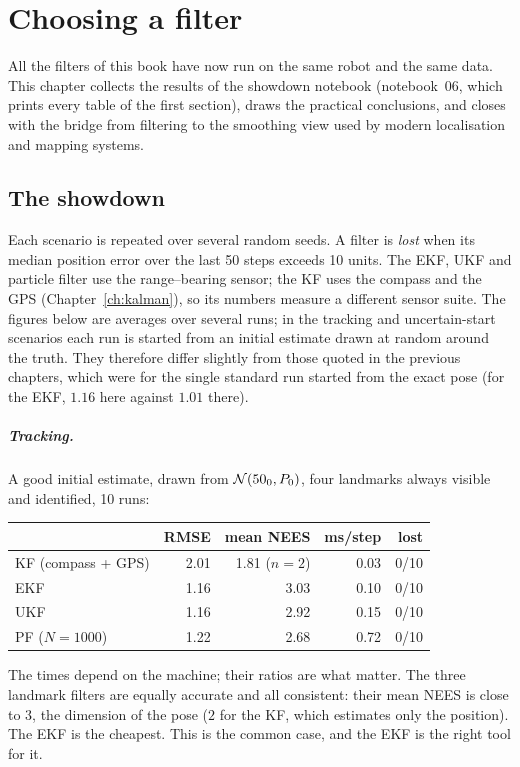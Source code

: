 \chapter{Choosing a filter}
\label{ch:choosing}

All the filters of this book have now run on the same robot and the same
data. This chapter collects the results of the showdown notebook
(notebook~06, which prints every table of the first section), draws
the practical conclusions, and closes with the bridge from filtering to
the smoothing view used by modern localisation and mapping systems.

\section{The showdown}

Each scenario is repeated over several random seeds. A filter is
\emph{lost} when its median position error over the last 50 steps exceeds
10 units. The EKF, UKF and particle filter use the range--bearing sensor;
the KF uses the compass and the GPS (Chapter~\ref{ch:kalman}), so its
numbers measure a different sensor suite. The figures below are averages
over several runs; in the tracking and uncertain-start scenarios each run
is started from an initial estimate drawn at random around the truth. They therefore differ slightly from those quoted in the
previous chapters, which were for the single standard run started from
the exact pose (for the EKF, $1.16$ here against $1.01$ there).

\paragraph{Tracking.} A good initial estimate, drawn from
$\mathcal{N}(50_0,P_0)$, four landmarks always visible and identified, 10
runs:
\begin{center}
\begin{tabular}{@{}lrrrr@{}}
\toprule
& RMSE & mean NEES & ms/step & lost\\
\midrule
KF (compass + GPS) & 2.01 & 1.81 ($n=2$) & 0.03 & 0/10\\
EKF & 1.16 & 3.03 & 0.10 & 0/10\\
UKF & 1.16 & 2.92 & 0.15 & 0/10\\
PF ($N=1000$) & 1.22 & 2.68 & 0.72 & 0/10\\
\bottomrule
\end{tabular}
\end{center}
The times depend on the machine; their ratios are what matter. The three
landmark filters are equally accurate and all consistent: their mean NEES
is close to $3$, the dimension of the pose ($2$ for the KF, which
estimates only the position). The EKF is the cheapest. This is the common case, and the EKF is the right
tool for it.


